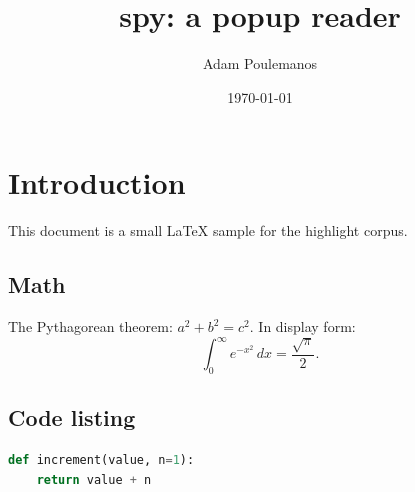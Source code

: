 \documentclass[11pt]{article}
\title{spy: a popup reader}
\author{Adam Poulemanos}
\date{\today}
\begin{document}
\maketitle

\section{Introduction}
This document is a small \LaTeX{} sample for the highlight corpus.

\subsection{Math}
The Pythagorean theorem: $a^2 + b^2 = c^2$. In display form:
\[
  \int_{0}^{\infty} e^{-x^2}\,dx = \frac{\sqrt{\pi}}{2}.
\]

\subsection{Code listing}
\begin{lstlisting}[language=Python]
def increment(value, n=1):
    return value + n
\end{lstlisting}
\end{document}
